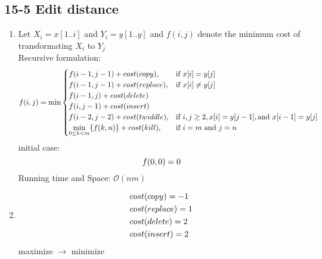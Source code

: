 \subsection*{15-5 Edit distance}
\begin{enumerate}
	\item	Let $X_i = x[1 .. i]$ and $Y_i = y[1 .. y]$ and $f(i ,j)$ denote the minimum cost of transformating $X_i$ to $Y_j$ \\
		Recursive formulation:
		\begin{equation} \notag
			f(i, j) = \min \begin{cases}
				f(i - 1, j - 1) + cost(copy),	& \mbox{if } x[i] = y[j] \\
				f(i - 1, j - 1) + cost(replace),& \mbox{if } x[i] \neq y[j] \\
				f(i - 1, j) + cost(delete) \\
				f(i, j - 1) + cost(insert) \\
				f(i - 2, j - 2) + cost(twiddle),& \mbox{if } i, j \geq 2,x[i] = y[j - 1],\mbox{and } x[i - 1] = y[j] \\
				\displaystyle{\min_{0 \leq k < m}} \{f(k, n)\} + cost(kill), & \mbox{if } i = m \mbox{ and } j = n
			\end{cases}
		\end{equation}
		initial case:
		\begin{equation} \notag
			f(0, 0) = 0
		\end{equation}
		Running time and Space: $\mathcal{O}(nm)$
	\item	\begin{equation} \notag
		\begin{aligned}
			&cost(copy) = -1 \\
			&cost(replace) = 1 \\
			&cost(delete) = 2 \\
			&cost(insert) = 2
		\end{aligned}
		\end{equation}
		maximize $\rightarrow$ minimize
\end{enumerate}

